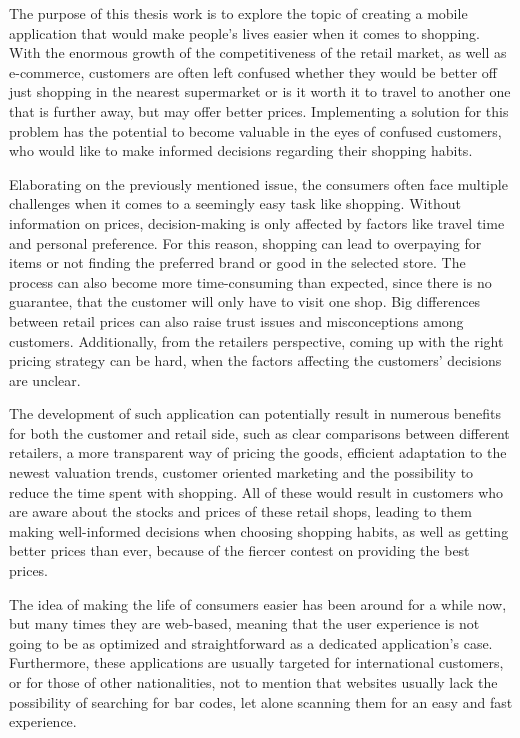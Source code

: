 The purpose of this thesis work is to explore the topic of creating a mobile application that would make people's lives easier when it comes to shopping. With the enormous growth of the competitiveness of the retail market, as well as e-commerce, customers are often left confused whether they would be better off just shopping in the nearest supermarket or is it worth it to travel to another one that is further away, but may offer better prices. Implementing a solution for this problem has the potential to become valuable in the eyes of confused customers, who would like to make informed decisions regarding their shopping habits.

Elaborating on the previously mentioned issue, the consumers often face multiple challenges when it comes to a seemingly easy task like shopping. Without information on prices, decision-making is only affected by factors like travel time and personal preference. For this reason, shopping can lead to overpaying for items or not finding the preferred brand or good in the selected store. The process can also become more time-consuming than expected, since there is no guarantee, that the customer will only have to visit one shop. Big differences between retail prices can also raise trust issues and misconceptions among customers. Additionally, from the retailers perspective, coming up with the right pricing strategy can be hard, when the factors affecting the customers' decisions are unclear.

The development of such application can potentially result in numerous benefits for both the customer and retail side, such as clear comparisons between different retailers, a more transparent way of pricing the goods, efficient adaptation to the newest valuation trends, customer oriented marketing and the possibility to reduce the time spent with shopping. All of these would result in customers who are aware about the stocks and prices of these retail shops, leading to them making well-informed decisions when choosing shopping habits, as well as getting better prices than ever, because of the fiercer contest on providing the best prices.

The idea of making the life of consumers easier has been around for a while now, but many times they are web-based, meaning that the user experience is not going to be as optimized and straightforward as a dedicated application's case. Furthermore, these applications are usually targeted for international customers, or for those of other nationalities, not to mention that websites usually lack the possibility of searching for bar codes, let alone scanning them for an easy and fast experience.

